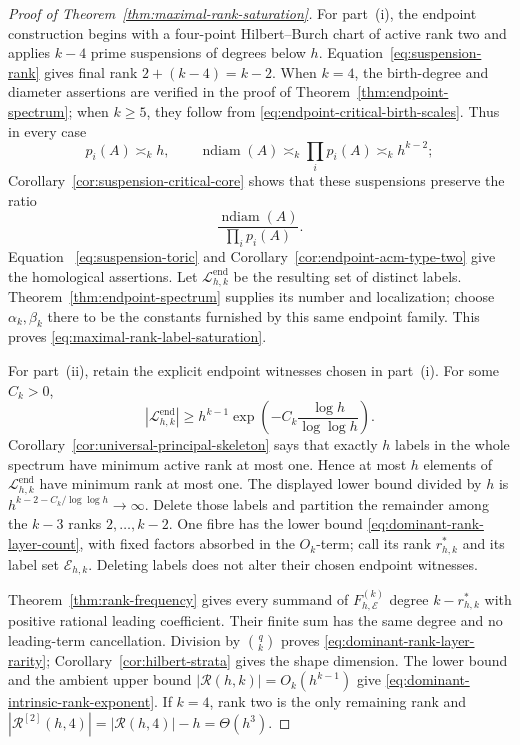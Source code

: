 \documentclass[11pt,reqno]{amsart}
\theoremstyle{definition}
\theoremstyle{remark}
\newcommand{\Rcal}{\mathcal R}
\newcommand{\ndiam}{\operatorname{ndiam}}
\begin{document}
\begin{proof}[Proof of Theorem~\ref{thm:maximal-rank-saturation}]
For part~\textup{(i)}, the endpoint construction begins with a four-point
Hilbert--Burch chart of active rank two and applies $k-4$ prime suspensions
of degrees below $h$.  Equation~\eqref{eq:suspension-rank} gives final rank
$2+(k-4)=k-2$.  When $k=4$, the birth-degree and diameter assertions are
verified in the proof of Theorem~\ref{thm:endpoint-spectrum}; when $k\geq5$,
they follow from \eqref{eq:endpoint-critical-birth-scales}.  Thus in every
case
\[
 p_i(A)\asymp_k h,
 \qquad
 \ndiam(A)\asymp_k\prod_i p_i(A)\asymp_k h^{k-2};
\]
Corollary~\ref{cor:suspension-critical-core} shows that these suspensions
preserve the ratio
\[
 \frac{\ndiam(A)}{\prod_i p_i(A)}.
\]
Equation~
\eqref{eq:suspension-toric} and
Corollary~\ref{cor:endpoint-acm-type-two} give the homological assertions.
Let
$\mathcal L^{\mathrm{end}}_{h,k}$ be the resulting set of distinct labels.
Theorem~\ref{thm:endpoint-spectrum} supplies its number and localization;
choose $\alpha_k,\beta_k$ there to be the constants furnished by this same
endpoint family.  This proves \eqref{eq:maximal-rank-label-saturation}.

For part~\textup{(ii)}, retain the explicit endpoint witnesses chosen in
part~\textup{(i)}.  For some $C_k>0$,
\[
 |\mathcal L^{\mathrm{end}}_{h,k}|\geq
 h^{k-1}\exp\!\left(-C_k\frac{\log h}{\log\log h}\right).
\]
Corollary~\ref{cor:universal-principal-skeleton} says that exactly $h$ labels
in the whole spectrum have minimum active rank at most one.  Hence at most
$h$ elements of $\mathcal L^{\mathrm{end}}_{h,k}$ have minimum rank at most
one.  The displayed lower bound divided by $h$ is
$h^{k-2-C_k/\log\log h}\to\infty$.  Delete those labels and partition the
remainder among the $k-3$ ranks $2,\ldots,k-2$.  One fibre has the lower
bound \eqref{eq:dominant-rank-layer-count}, with fixed factors absorbed in
the $O_k$-term; call its rank $r^\ast_{h,k}$ and its label set
$\mathcal E_{h,k}$.  Deleting labels does not alter their chosen endpoint
witnesses.

Theorem~\ref{thm:rank-frequency} gives every summand of
$F^{(k)}_{h,\mathcal E}$ degree $k-r^\ast_{h,k}$ with positive rational
leading coefficient.  Their finite sum has the same degree and no
leading-term cancellation.  Division by $\binom qk$ proves
\eqref{eq:dominant-rank-layer-rarity}; Corollary~\ref{cor:hilbert-strata}
gives the shape dimension.  The lower bound and the ambient upper bound
$|\Rcal(h,k)|=O_k(h^{k-1})$ give
\eqref{eq:dominant-intrinsic-rank-exponent}.  If $k=4$, rank two is the only
remaining rank and
$|\Rcal^{[2]}(h,4)|=|\Rcal(h,4)|-h=\Theta(h^3)$.
\end{proof}
\end{document}
